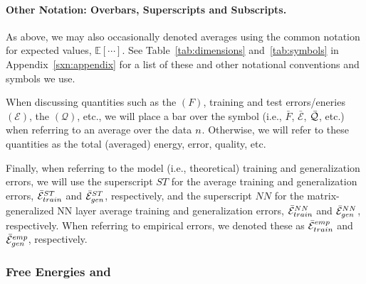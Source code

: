 \paragraph{Other Notation: Overbars, Superscripts and Subscripts.}
As above, we may also occasionally denoted averages using the common notation for expected values, $\mathbb{E}[\cdots]$.
See Table~\ref{tab:dimensions} and~\ref{tab:symbols} in Appendix~\ref{sxn:appendix} for a list of these and other notational conventions and symbols we use.

When discussing quantities such as the \FreeEnergy $(F)$, 
training and test errors/eneries $(\mathcal{E})$, 
the \LayerQuality $(\mathcal{Q})$, etc.,
we will place a bar over the symbol (i.e., $\bar{F}$, $\bar{\mathcal{E}}$, $\bar{\mathcal{Q}}$, etc.) when referring to
an average over the data $n$.
Otherwise, we will refer to these quantities as the total (averaged) energy, error, quality, etc.


Finally, when referring to the model (i.e., theoretical)
training and generalization errors, we will use the superscript $ST$ for
the average \StudentTeacher training and generalization errors, $\bar{\mathcal{E}}^{ST}_{train}$ and $\bar{\mathcal{E}}^{ST}_{gen}$, respectively, and
the superscript $NN$ for the matrix-generalized NN layer average
training and generalization errors, $\bar{\mathcal{E}}^{NN}_{train}$ and $\bar{\mathcal{E}}^{NN}_{gen}$, respectively.
When referring to empirical errors, we denoted these as $\bar{\mathcal{E}}^{emp}_{train}$ and $\bar{\mathcal{E}}^{emp}_{gen}$, respectively.


\subsubsection{Free Energies and \GeneratingFunctions} 
\label{sxn:mathP_free_energies}

